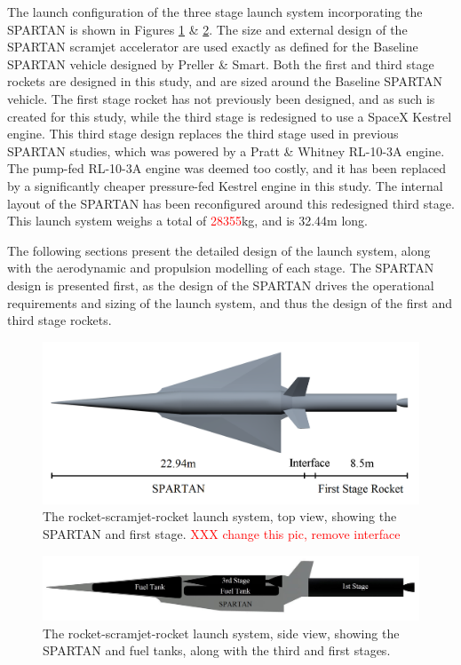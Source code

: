 The launch configuration of the three stage launch system incorporating the SPARTAN is shown in Figures \ref{fig:NoInternal} \& \ref{fig:INTERNALS}. 
 The size and external design of the SPARTAN scramjet accelerator are used exactly as defined for the Baseline SPARTAN vehicle designed by Preller \& Smart\cite{Preller2017b}. Both the first and third stage rockets are designed in this study, and are sized around the Baseline SPARTAN vehicle. 
 The first stage rocket has not previously been designed, and as such is created for this study, while the third stage is redesigned to use a SpaceX Kestrel engine. This third stage design replaces the third stage used in previous SPARTAN studies, which was powered by a Pratt \& Whitney RL-10-3A engine\cite{Preller2017b}. The pump-fed RL-10-3A engine was deemed too costly, and it has been replaced by a significantly cheaper pressure-fed Kestrel engine in this study.  
 The internal layout of the SPARTAN has been reconfigured around this redesigned third stage. 
 This launch system weighs a total of \textcolor{red}{28355}kg, and is 32.44m long. 
 
 The following sections present the detailed design of the launch system, along with the aerodynamic and propulsion modelling of each stage.
The SPARTAN design is presented first, as the design of the SPARTAN drives the operational requirements and sizing of the launch system, and thus the design of the first and third stage rockets. 


\begin{figure}[ht]
	\centering
	\includegraphics[width=0.7\linewidth]{figures/3_vehicle_design/NoInternal}
	\caption{The rocket-scramjet-rocket launch system, top view, showing the SPARTAN and first stage. \textcolor{red}{XXX change this pic, remove interface}}
	\label{fig:NoInternal}
\end{figure}

\begin{figure}[ht]
	\centering
	\includegraphics[width=0.7\linewidth]{figures/3_vehicle_design/INTERNALS}
	\caption{The rocket-scramjet-rocket launch system, side view, showing the SPARTAN and fuel tanks, along with the third and first stages.}
	\label{fig:INTERNALS}
\end{figure}









